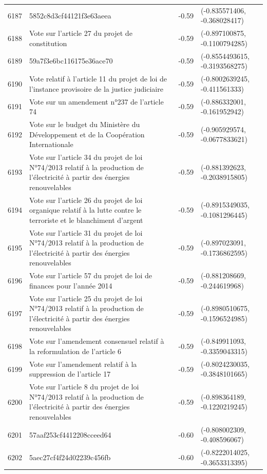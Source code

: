 \begin{table}[ht]
\begin{tabular}{rlrl}
  6187 & 5852c8d3cf44121f3e63aeea & -0.59 & (-0.835571406, -0.368028417) \\ 
  6188 & Vote sur l'article 27 du projet de constitution & -0.59 & (-0.897100875, -0.1100794285) \\ 
  6189 & 59a7f3e6bc116175e36ace70 & -0.59 & (-0.8554493615, -0.3193568275) \\ 
  6190 & Vote relatif à l'article 11 du projet de loi de l'instance provisoire de la justice judiciaire & -0.59 & (-0.8002639245, -0.411561333) \\ 
  6191 & Vote sur un amendement n°237 de l'article 74 & -0.59 & (-0.886332001, -0.161952942) \\ 
  6192 & Vote sur le budget du Ministère du Développement et de la Coopération Internationale & -0.59 & (-0.905929574, -0.0677833621) \\ 
  6193 & Vote sur l'article 34 du projet de loi N°74/2013 relatif à la production de l'électricité à partir des énergies renouvelables & -0.59 & (-0.881392623, -0.2038915805) \\ 
  6194 & Vote sur l'article 26 du projet de loi organique relatif à la lutte contre le terroriste et le blanchiment d'argent & -0.59 & (-0.8915349035, -0.1081296445) \\ 
  6195 & Vote sur l'article 31 du projet de loi N°74/2013 relatif à la production de l'électricité à partir des énergies renouvelables & -0.59 & (-0.897023091, -0.1736862595) \\ 
  6196 & Vote sur l'article 57 du projet de loi de finances pour l'année 2014 & -0.59 & (-0.881208669, -0.244619968) \\ 
  6197 & Vote sur l'article 25 du projet de loi N°74/2013 relatif à la production de l'électricité à partir des énergies renouvelables & -0.59 & (-0.8980510675, -0.1596524985) \\ 
  6198 & Vote sur l'amendement consensuel relatif à la reformulation de l'article 6 & -0.59 & (-0.849911093, -0.3359043315) \\ 
  6199 & Vote sur l'amendement relatif à la suppression de l'article 17 & -0.59 & (-0.8024230035, -0.3848101665) \\ 
  6200 & Vote sur l'article 8 du projet de loi N°74/2013 relatif à la production de l'électricité à partir des énergies renouvelables & -0.59 & (-0.898364189, -0.1220219245) \\ 
  6201 & 57aaf253cf4412208cceed64 & -0.60 & (-0.808002309, -0.408596067) \\ 
  6202 & 5aec27cf4f24d02239c456fb & -0.60 & (-0.8222014025, -0.3653313395) \\ 

\end{tabular}
\end{table}
